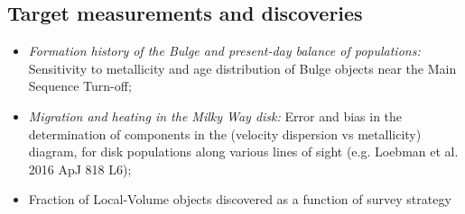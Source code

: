 \subsection{Target measurements and discoveries}
\label{sec:\secname:MW_Future_targets}


\begin{itemize}
  \item {\it Formation history of the Bulge and present-day balance of populations:} Sensitivity to metallicity and age distribution of Bulge objects near the Main Sequence Turn-off;
    \item {\it Migration and heating in the Milky Way disk:} Error and bias in the determination of components in the
      (velocity dispersion vs metallicity) diagram, for disk
      populations along various lines of sight (e.g. Loebman et al. 2016 ApJ 818 L6);
    \item Fraction of Local-Volume objects discovered as a function of survey strategy
\end{itemize}
















\navigationbar
